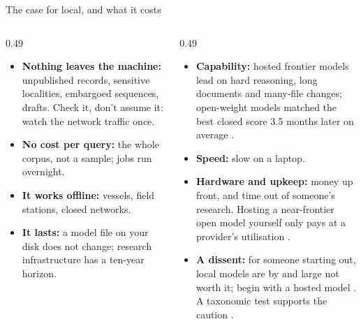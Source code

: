 \documentclass[11pt,aspectratio=169]{beamer}
\begin{document}
\begin{frame}{The case for local, and what it costs}
  \begin{columns}[T]
    \begin{column}{0.49\textwidth}\footnotesize
      \begin{itemize}
        \item \textbf{Nothing leaves the machine:} unpublished records,
          sensitive localities, embargoed sequences, drafts. Check it, don't
          assume it: watch the network traffic once.
        \item \textbf{No cost per query:} the whole corpus, not a sample;
          jobs run overnight.
        \item \textbf{It works offline:} vessels, field stations, closed
          networks.
        \item \textbf{It lasts:} a model file on your disk does not change;
          research infrastructure has a ten-year horizon.
      \end{itemize}
    \end{column}
    \begin{column}{0.49\textwidth}\footnotesize
      \begin{itemize}
        \item \textbf{Capability:} hosted frontier models lead on hard
          reasoning, long documents and many-file changes; open-weight
          models matched the best closed score 3.5 months later on average
          \parencite{emberson2025openweightlag}.
        \item \textbf{Speed:} slow on a laptop.
        \item \textbf{Hardware and upkeep:} money up front, and time out of
          someone's research. Hosting a near-frontier open model yourself
          only pays at a provider's utilisation
          \parencite{wickham2026tokencost}.
        \item \textbf{A dissent:} for someone starting out, local models
          are by and large not worth it; begin with a hosted model
          \parencite{wickham2026nobs}. A taxonomic test supports the
          caution \parencite{schmidtlebuhn2025morphology}.
      \end{itemize}
    \end{column}
  \end{columns}
\end{frame}
\end{document}
